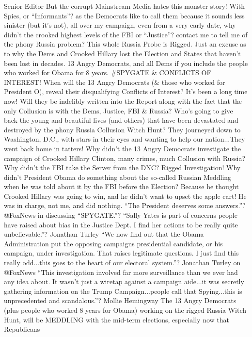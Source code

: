 Senior Editor But the corrupt Mainstream Media hates this monster story!
With Spies, or ``Informants''? as the Democrats like to call them
because it sounds less sinister (but it's not), all over my campaign,
even from a very early date, why didn't the crooked highest levels of
the FBI or ``Justice''? contact me to tell me of the phony Russia
problem? This whole Russia Probe is Rigged. Just an excuse as to why the
Dems and Crooked Hillary lost the Election and States that haven't been
lost in decades. 13 Angry Democrats, and all Dems if you include the
people who worked for Obama for 8 years. \#SPYGATE \& CONFLICTS OF
INTEREST! When will the 13 Angry Democrats (\& those who worked for
President O), reveal their disqualifying Conflicts of Interest? It's
been a long time now! Will they be indelibly written into the Report
along with the fact that the only Collusion is with the Dems, Justice,
FBI \& Russia? Who's going to give back the young and beautiful lives
(and others) that have been devastated and destroyed by the phony Russia
Collusion Witch Hunt? They journeyed down to Washington, D.C., with
stars in their eyes and wanting to help our nation...They went back home
in tatters! Why didn't the 13 Angry Democrats investigate the campaign
of Crooked Hillary Clinton, many crimes, much Collusion with Russia? Why
didn't the FBI take the Server from the DNC? Rigged Investigation! Why
didn't President Obama do something about the so-called Russian Meddling
when he was told about it by the FBI before the Election? Because he
thought Crooked Hillary was going to win, and he didn't want to upset
the apple cart! He was in charge, not me, and did nothing. ``The
President deserves some answers.''? @FoxNews in discussing ``SPYGATE.''?
``Sally Yates is part of concerns people have raised about bias in the
Justice Dept. I find her actions to be really quite unbelievable.''?
Jonathan Turley ``We now find out that the Obama Administration put the
opposing campaigns presidential candidate, or his campaign, under
investigation. That raises legitimate questions. I just find this really
odd...this goes to the heart of our electoral system.''? Jonathan Turley
on @FoxNews ``This investigation involved far more surveillance than we
ever had any idea about. It wasn't just a wiretap against a campaign
aide...it was secretly gathering information on the Trump
Campaign...people call that Spying...this is unprecedented and
scandalous.''? Mollie Hemingway The 13 Angry Democrats (plus people who
worked 8 years for Obama) working on the rigged Russia Witch Hunt, will
be MEDDLING with the mid-term elections, especially now that Republicans
